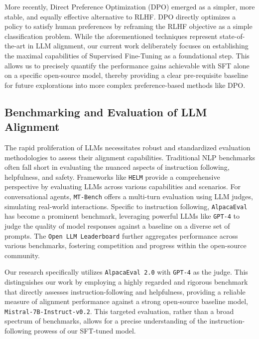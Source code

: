 \documentclass[11pt]{article}
\begin{document}
More recently, Direct Preference Optimization (DPO) \cite{rafailov2023direct} emerged as a simpler, more stable, and equally effective alternative to RLHF. DPO directly optimizes a policy to satisfy human preferences by reframing the RLHF objective as a simple classification problem. While the aforementioned techniques represent state-of-the-art in LLM alignment, our current work deliberately focuses on establishing the maximal capabilities of Supervised Fine-Tuning as a foundational step. This allows us to precisely quantify the performance gains achievable with SFT alone on a specific open-source model, thereby providing a clear pre-requisite baseline for future explorations into more complex preference-based methods like DPO.

\subsection{Benchmarking and Evaluation of LLM Alignment}
The rapid proliferation of LLMs necessitates robust and standardized evaluation methodologies to assess their alignment capabilities. Traditional NLP benchmarks often fall short in evaluating the nuanced aspects of instruction following, helpfulness, and safety. Frameworks like \texttt{HELM} \cite{liang2022holistic} provide a comprehensive perspective by evaluating LLMs across various capabilities and scenarios. For conversational agents, \texttt{MT-Bench} \cite{zheng2023llm_arena} offers a multi-turn evaluation using LLM judges, simulating real-world interactions. Specific to instruction following, \texttt{AlpacaEval} \cite{alpaca_eval_1, alpaca_eval_2} has become a prominent benchmark, leveraging powerful LLMs like \texttt{GPT-4} to judge the quality of model responses against a baseline on a diverse set of prompts. The \texttt{Open LLM Leaderboard} \cite{guerreiro2023open_llm_leaderboard} further aggregates performance across various benchmarks, fostering competition and progress within the open-source community.

Our research specifically utilizes \texttt{AlpacaEval 2.0} \cite{alpaca_eval_2} with \texttt{GPT-4} as the judge. This distinguishes our work by employing a highly regarded and rigorous benchmark that directly assesses instruction-following and helpfulness, providing a reliable measure of alignment performance against a strong open-source baseline model, \texttt{Mistral-7B-Instruct-v0.2}. This targeted evaluation, rather than a broad spectrum of benchmarks, allows for a precise understanding of the instruction-following prowess of our SFT-tuned model.
\end{document}
